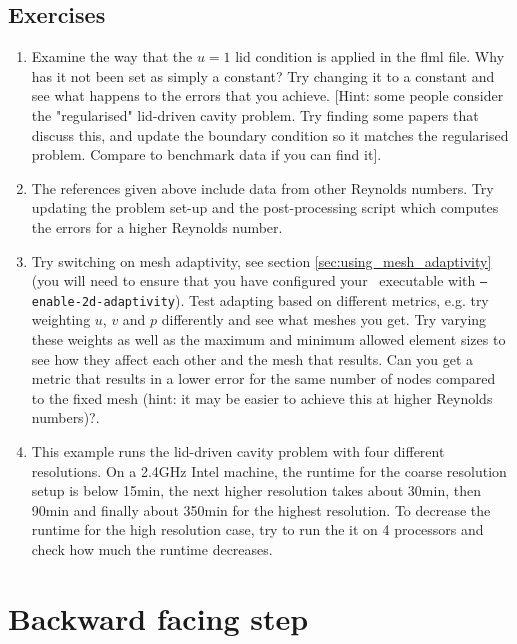 \subsection{Exercises}
\begin{enumerate}
\item Examine the way that the $u=1$ lid condition is applied in the flml file. Why has it not been set as simply a constant?
Try changing it to a constant and see what happens to the errors that you achieve. [Hint: some people consider the "regularised" 
lid-driven cavity problem. Try finding some papers that discuss this, and update the boundary condition so it matches the 
regularised problem. Compare to benchmark data if you can find it].
\item The references given above include data from other Reynolds numbers. Try updating the problem set-up and the post-processing script which computes
the errors for a higher Reynolds number.
\item Try switching on mesh adaptivity, see section \ref{sec:using_mesh_adaptivity} (you will need to ensure that you have configured your \fluidity\ executable with \texttt{--enable-2d-adaptivity}). 
Test adapting based on different metrics, e.g. try weighting $u$, $v$ and $p$
differently and see what meshes you get. Try varying these weights as well as the maximum and minimum allowed element
sizes to see how they affect each other and the mesh that results. Can you get a metric that results in a lower
error for the same number of nodes compared to the fixed mesh (hint: it may be easier to achieve this at higher Reynolds numbers)?.
\item This example runs the lid-driven cavity problem with four different resolutions. On a 2.4GHz Intel machine, the runtime for the coarse resolution setup is below 15min, the next higher resolution takes about 30min, then 90min and finally about 350min for the highest resolution. To decrease the runtime for the high resolution case, try to run the it on 4 processors and check how much the runtime decreases.
\end{enumerate}



\section{Backward facing step}
\label{sec:backward_facing_step}


